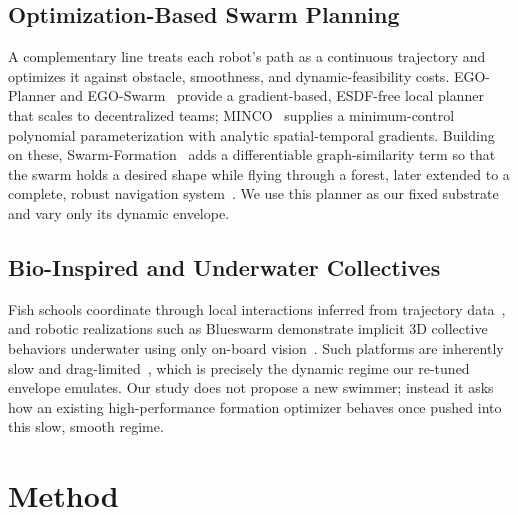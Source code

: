 \documentclass[journal]{IEEEtran}
\begin{document}
\subsection{Optimization-Based Swarm Planning}
A complementary line treats each robot's path as a continuous trajectory and
optimizes it against obstacle, smoothness, and dynamic-feasibility costs.
EGO-Planner and EGO-Swarm~\cite{zhou2021egoswarm} provide a gradient-based,
ESDF-free local planner that scales to decentralized teams;
MINCO~\cite{wang2022geometrically} supplies a minimum-control polynomial
parameterization with analytic spatial-temporal gradients. Building on these,
Swarm-Formation~\cite{quan2022distributed} adds a differentiable
graph-similarity term so that the swarm holds a desired shape while flying
through a forest, later extended to a complete, robust navigation
system~\cite{quan2023robust}. We use this planner as our fixed substrate and
vary only its dynamic envelope.

\subsection{Bio-Inspired and Underwater Collectives}
Fish schools coordinate through local interactions inferred from
trajectory data~\cite{katz2011inferring}, and robotic realizations such as
Blueswarm demonstrate implicit 3D collective behaviors underwater using only
on-board vision~\cite{berlinger2021implicit}. Such platforms are inherently
slow and drag-limited~\cite{lighthill1971large,scharff2018sensing}, which is
precisely the dynamic regime our re-tuned envelope emulates. Our study does
not propose a new swimmer; instead it asks how an existing high-performance
formation optimizer behaves once pushed into this slow, smooth regime.

\section{Method}
\label{sec:method}
\end{document}
